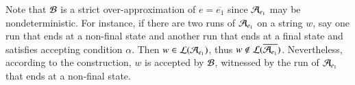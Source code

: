 Note that $\mathcal{B}$ is a strict over-approximation of $e = \overline{e_1}$ since $\mathcal{A}_{e_1}$ may be nondeterministic. For instance, if there are two runs of $\mathcal{A}_{e_1}$ on a string $w$, say one run that ends at a non-final state and another run that ends at a final state and satisfies accepting condition $\alpha$. Then $w \in \mathcal{L}(\mathcal{A}_{e_1})$, thus $w \not \in \mathcal{L}(\overline{\mathcal{A}_{e_1}})$. Nevertheless, according to the construction, $w$ is accepted by $\mathcal{B}$, witnessed by the run of $\mathcal{A}_{e_1}$ that ends at a non-final state. 


